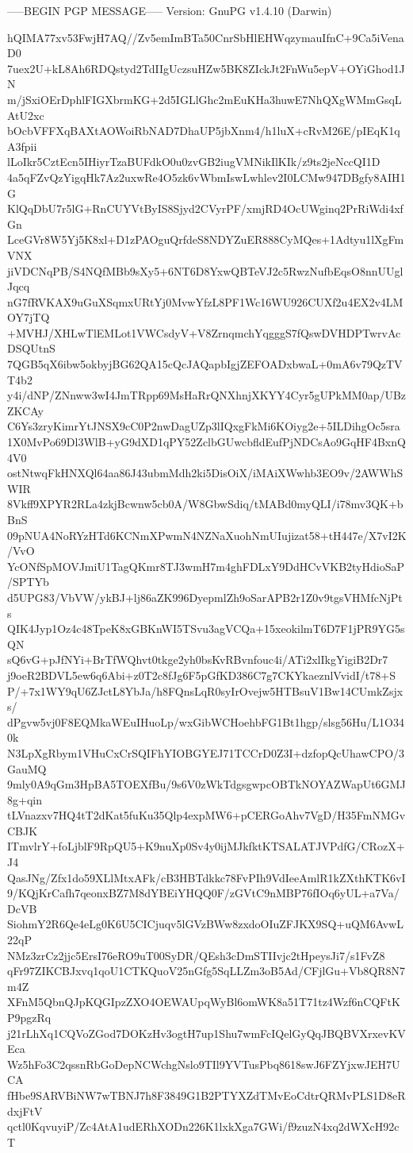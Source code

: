 -----BEGIN PGP MESSAGE-----
Version: GnuPG v1.4.10 (Darwin)

hQIMA77xv53FwjH7AQ//Zv5emImBTa50CnrSbHlEHWqzymauIfnC+9Ca5iVenaD0
7uex2U+kL8Ah6RDQstyd2TdIIgUczsuHZw5BK8ZIckJt2FnWu5epV+OYiGhod1JN
m/jSxiOErDphlFIGXbrmKG+2d5IGLlGhc2mEuKHa3huwE7NhQXgWMmGsqLAtU2xc
bOcbVFFXqBAXtAOWoiRbNAD7DhaUP5jbXnm4/h1luX+cRvM26E/pIEqK1qA3fpii
lLoIkr5CztEcn5IHiyrTzaBUFdkO0u0zvGB2iugVMNikIlKIk/z9ts2jeNccQI1D
4a5qFZvQzYigqHk7Az2uxwRe4O5zk6vWbmIswLwhlev2I0LCMw947DBgfy8AIH1G
KlQqDbU7r5lG+RnCUYVtByIS8Sjyd2CVyrPF/xmjRD4OcUWginq2PrRiWdi4xfGn
LceGVr8W5Yj5K8xl+D1zPAOguQrfdeS8NDYZuER888CyMQes+1Adtyu1lXgFmVNX
jiVDCNqPB/S4NQfMBb9sXy5+6NT6D8YxwQBTeVJ2c5RwzNufbEqsO8nnUUglJqcq
nG7fRVKAX9uGuXSqmxURtYj0MvwYfzL8PF1Wc16WU926CUXf2u4EX2v4LMOY7jTQ
+MVHJ/XHLwTlEMLot1VWCsdyV+V8ZrnqmchYqgggS7fQswDVHDPTwrvAcDSQUtnS
7QGB5qX6ibw5okbyjBG62QA15cQcJAQapbIgjZEFOADxbwaL+0mA6v79QzTVT4b2
y4i/dNP/ZNnww3wI4JmTRpp69MsHaRrQNXhnjXKYY4Cyr5gUPkMM0ap/UBzZKCAy
C6Ys3zryKimrYtJNSX9cC0P2nwDagUZp3lIQxgFkMi6KOiyg2e+5ILDihgOc5sra
1X0MvPo69Dl3WlB+yG9dXD1qPY52ZclbGUwcbfldEufPjNDCsAo9GqHF4BxnQ4V0
ostNtwqFkHNXQl64aa86J43ubmMdh2ki5DisOiX/iMAiXWwhb3EO9v/2AWWhSWIR
8Vkff9XPYR2RLa4zkjBcwnw5cb0A/W8GbwSdiq/tMABd0myQLI/i78mv3QK+bBnS
09pNUA4NoRYzHTd6KCNmXPwmN4NZNaXuohNmUIujizat58+tH447e/X7vI2K/VvO
YcONfSpMOVJmiU1TagQKmr8TJ3wmH7m4ghFDLxY9DdHCvVKB2tyHdioSaP/SPTYb
d5UPG83/VbVW/ykBJ+lj86aZK996DyepmlZh9oSarAPB2r1Z0v9tgsVHMfcNjPts
QIK4Jyp1Oz4c48TpeK8xGBKnWI5TSvu3agVCQa+15xeokilmT6D7F1jPR9YG5sQN
sQ6vG+pJfNYi+BrTfWQhvt0tkge2yh0bsKvRBvnfouc4i/ATi2xlIkgYigiB2Dr7
j9oeR2BDVL5ew6q6Abi+z0T2c8fJg6F5pGfKD386C7g7CKYkaeznlVvidI/t78+S
P/+7x1WY9qU6ZJctL8YbJa/h8FQnsLqR0syIrOvejw5HTBsuV1Bw14CUmkZsjxs/
dPgvw5vj0F8EQMkaWEuIHuoLp/wxGibWCHoehbFG1Bt1hgp/slsg56Hu/L1O340k
N3LpXgRbym1VHuCxCrSQIFhYIOBGYEJ71TCCrD0Z3I+dzfopQcUhawCPO/3GauMQ
9mly0A9qGm3HpBA5TOEXfBu/9s6V0zWkTdgsgwpcOBTkNOYAZWapUt6GMJ8g+qin
tLVnazxv7HQ4tT2dKat5fuKu35Qlp4expMW6+pCERGoAhv7VgD/H35FmNMGvCBJK
ITmvlrY+foLjblF9RpQU5+K9nuXp0Sv4y0ijMJkfktKTSALATJVPdfG/CRozX+J4
QasJNg/Zfx1do59XLlMtxAFk/cB3HBTdkkc78FvPIh9VdIeeAmlR1kZXthKTK6vI
9/KQjKrCafh7qeonxBZ7M8dYBEiYHQQ0F/zGVtC9nMBP76fIOq6yUL+a7Va/DcVB
SiohmY2R6Qe4eLg0K6U5CICjuqv5lGVzBWw8zxdoOIuZFJKX9SQ+uQM6AvwL22qP
NMz3zrCz2jjc5ErsI76eRO9uT00SyDR/QEsh3cDmSTIIvjc2tHpeysJi7/s1FvZ8
qFr97ZIKCBJxvq1qoU1CTKQuoV25nGfg5SqLLZm3oB5Ad/CFjlGu+Vb8QR8N7m4Z
XFnM5QbnQJpKQGIpzZXO4OEWAUpqWyBl6omWK8a51T71tz4Wzf6nCQFtKP9pgzRq
j21rLhXq1CQVoZGod7DOKzHv3ogtH7up1Shu7wmFcIQelGyQqJBQBVXrxevKVEca
Wz5hFo3C2qssnRbGoDepNCWchgNslo9TIl9YVTusPbq8618swJ6FZYjxwJEH7UCA
fHbe9SARVBiNW7wTBNJ7h8F3849G1B2PTYXZdTMvEoCdtrQRMvPLS1D8eRdxjFtV
qctl0KqvuyiP/Zc4AtA1udERhXODn226K1lxkXga7GWi/f9zuzN4xq2dWXcH92cT
